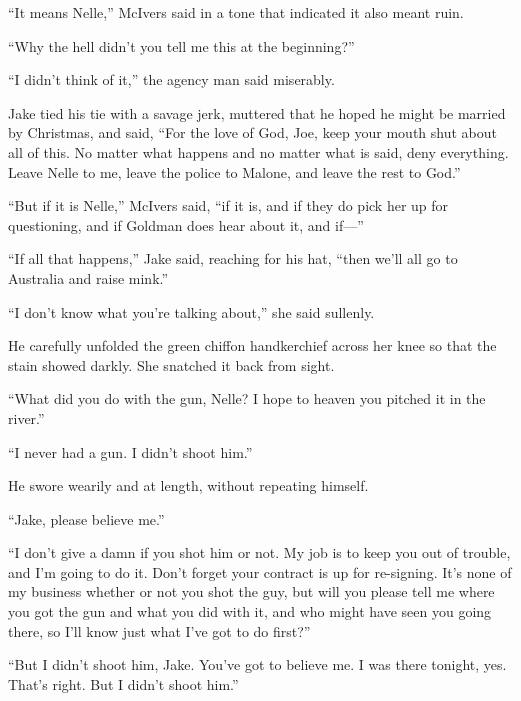 \documentclass{novel}
\begin{document}
“It means Nelle,” McIvers said in a tone that indicated it also meant ruin.

“Why the hell didn’t you tell me this at the beginning?”

“I didn’t think of it,” the agency man said miserably.

Jake tied his tie with a savage jerk, muttered that he hoped he might be married by Christmas, and said, “For the love of God, Joe, keep your mouth shut about all of this. No matter what happens and no matter what is said, deny everything. Leave Nelle to me, leave the police to Malone, and leave the rest to God.”

“But if it is Nelle,” McIvers said, “if it is, and if they do pick her up for questioning, and if Goldman does hear about it, and if—”

“If all that happens,” Jake said, reaching for his hat, “then we’ll all go to Australia and raise mink.”

\begin{ChapterStart}
\vspace{3\nbs}
\end{ChapterStart}

“I don’t know what you’re talking about,” she said sullenly.

He carefully unfolded the green chiffon handkerchief across her knee so that the stain showed darkly. She snatched it back from sight.

“What did you do with the gun, Nelle? I hope to heaven you pitched it in the river.”

“I never had a gun. I didn’t shoot him.”

He swore wearily and at length, without repeating himself.

“Jake, please believe me.”

“I don’t give a damn if you shot him or not. My job is to keep you out of trouble, and I’m going to do it. Don’t forget your contract is up for re-signing. It’s none of my business whether or not you shot the guy, but will you please tell me where you got the gun and what you did with it, and who might have seen you going there, so I’ll know just what I’ve got to do first?”

“But I didn’t shoot him, Jake. You’ve got to believe me. I was there tonight, yes. That’s right. But I didn’t shoot him.”
\end{document}
